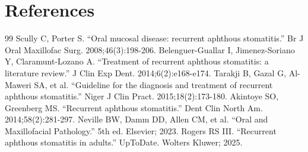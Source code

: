 \section*{References}
\begin{thebibliography}{99}
 Scully C, Porter S. ``Oral mucosal disease: recurrent aphthous stomatitis.'' Br J Oral Maxillofac Surg. 2008;46(3):198-206.
 Belenguer-Guallar I, Jimenez-Soriano Y, Claramunt-Lozano A. ``Treatment of recurrent aphthous stomatitis: a literature review.'' J Clin Exp Dent. 2014;6(2):e168-e174.
 Tarakji B, Gazal G, Al-Maweri SA, et al. ``Guideline for the diagnosis and treatment of recurrent aphthous stomatitis.'' Niger J Clin Pract. 2015;18(2):173-180.
 Akintoye SO, Greenberg MS. ``Recurrent aphthous stomatitis.'' Dent Clin North Am. 2014;58(2):281-297.
 Neville BW, Damm DD, Allen CM, et al. ``Oral and Maxillofacial Pathology.'' 5th ed. Elsevier; 2023.
 Rogers RS III. ``Recurrent aphthous stomatitis in adults.'' UpToDate. Wolters Kluwer; 2025.
\end{thebibliography}
